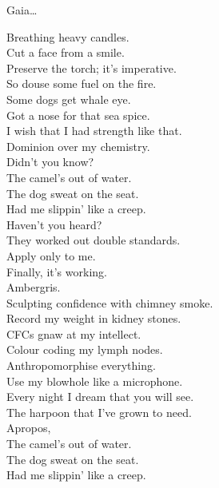 Gaia… \\




Breathing heavy candles. \\
Cut a face from a smile. \\
Preserve the torch; it's imperative. \\
So douse some fuel on the fire. \\

Some dogs get whale eye. \\
Got a nose for that sea spice. \\
I wish that I had strength like that. \\
Dominion over my chemistry. \\

Didn't you know? \\
The camel's out of water. \\
The dog sweat on the seat. \\
Had me slippin' like a creep. \\

Haven't you heard? \\
They worked out double standards. \\
Apply only to me. \\
Finally, it's working. \\
Ambergris. \\

Sculpting confidence with chimney smoke. \\
Record my weight in kidney stones. \\
CFCs gnaw at my intellect. \\
Colour coding my lymph nodes. \\

Anthropomorphise everything. \\
Use my blowhole like a microphone. \\
Every night I dream that you will see. \\
The harpoon that I've grown to need. \\

Apropos, \\
The camel's out of water. \\
The dog sweat on the seat. \\
Had me slippin' like a creep. \\


